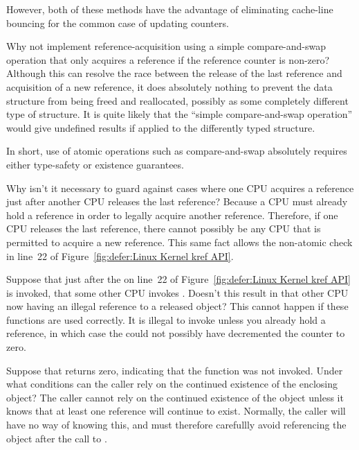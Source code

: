 	However, both of these methods have the advantage of eliminating
	cache-line bouncing for the common case of updating counters.

\QuickQ{}
	Why not implement reference-acquisition using
	a simple compare-and-swap operation that only
	acquires a reference if the reference counter is
	non-zero?
\QuickA{}
	Although this can resolve the race between the release of
	the last reference and acquisition of a new reference,
	it does absolutely nothing to prevent the data structure
	from being freed and reallocated, possibly as some completely
	different type of structure.
	It is quite likely that the ``simple compare-and-swap
	operation'' would give undefined results if applied to the
	differently typed structure.

	In short, use of atomic operations such as compare-and-swap
	absolutely requires either type-safety or existence guarantees.

\QuickQ{}
	Why isn't it necessary to guard against cases where one CPU
	acquires a reference just after another CPU releases the last
	reference?
\QuickA{}
	Because a CPU must already hold a reference in order
	to legally acquire another reference.
	Therefore, if one CPU releases the last reference,
	there cannot possibly be any CPU that is permitted
	to acquire a new reference.
	This same fact allows the non-atomic check in line~22
	of Figure~\ref{fig:defer:Linux Kernel kref API}.

\QuickQ{}
	Suppose that just after the 
	on line~22 of
	Figure~\ref{fig:defer:Linux Kernel kref API} is invoked,
	that some other CPU invokes .
	Doesn't this result in that other CPU now having an illegal
	reference to a released object?
\QuickA{}
	This cannot happen if these functions are used correctly.
	It is illegal to invoke  unless you already
	hold a reference, in which case the  could
	not possibly have decremented the counter to zero.

\QuickQ{}
	Suppose that  returns zero, indicating that
	the  function was not invoked.
	Under what conditions can the caller rely on the continued
	existence of the enclosing object?
\QuickA{}
	The caller cannot rely on the continued existence of the
	object unless it knows that at least one reference will
	continue to exist.
	Normally, the caller will have no way of knowing this, and
	must therefore carefullly avoid referencing the object after
	the call to .


